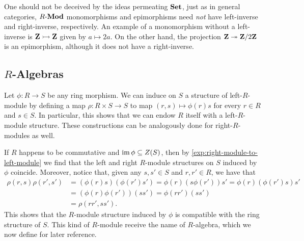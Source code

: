 \begin{example}
\label{exp:right-left-inverse-monic-epic}
One should not be deceived by the ideas permeating \({\textbf{Set}}\), just as in general
categories, \({R\text{-}\textbf{Mod}}\) monomorphisms and epimorphisms need \emph{not} have
left-inverse and right-inverse, respectively. An example of a monomorphism
without a left-inverse is \(\mathbf{Z} \rightarrowtail \mathbf{Z}\) given by \(a \mapsto 2 a\). On the
other hand, the projection \(\mathbf{Z} \twoheadrightarrow \mathbf{Z}/2\mathbf{Z}\) is an epimorphism, although it
does not have a right-inverse.
\end{example}


\subsection{\texorpdfstring{\(R\)}{R}-Algebras}

\begin{example}
\label{exp:R-modules-induced-by-ring-morphism}
Let \(\phi: R \to S\) be any ring morphism. We can induce on \(S\) a structure
of left-\(R\)-module by defining a map \(\rho: R \times S \to S\) to map
\((r, s) \mapsto \phi(r) s\) for every \(r \in R\) and \(s \in S\). In
particular, this shows that we can endow \(R\) itself with a left-\(R\)-module
structure. These constructions can be analogously done for right-\(R\)-modules
as well.

If \(R\) happens to be commutative and \(\operatorname{im} \phi \subseteq Z(S)\), then by
\cref{exp:right-module-to-left-module} we find that the left and right
\(R\)-module structures on \(S\) induced by \(\phi\) coincide. Moreover, notice
that, given any \(s, s' \in S\) and \(r, r' \in R\), we have that
\begin{align*}
\rho(r, s) \rho(r', s')
&= (\phi(r) s) (\phi(r') s')
= \phi(r) (s \phi(r')) s'
= \phi(r) (\phi(r') s) s' \\
&= (\phi(r) \phi(r')) (s s')
= \phi(r r') (s s') \\
&= \rho(r r', s s').
\end{align*}
This shows that the \(R\)-module structure induced by \(\phi\) is compatible
with the ring structure of \(S\). This kind of \(R\)-module receive the
name of \(R\)-algebra, which we now define for later reference.
\end{example}

